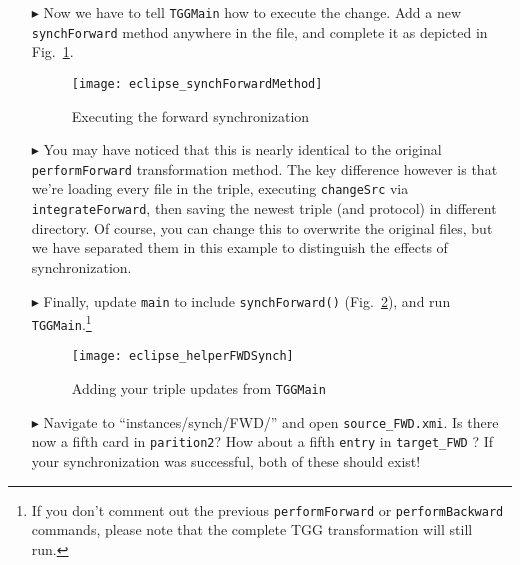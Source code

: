 \begin{itemize}
\item[$\blacktriangleright$] Now we have to tell \texttt{TGGMain} how to execute the change. Add a new \texttt{synchForward} method anywhere in the file, and
complete it as depicted in Fig.~\ref{eclipse:SynchForwardMethod}.

\vspace{0.5cm}

\begin{figure}[htbp]
\begin{center}
  \texttt{[image: eclipse\_synchForwardMethod]}
  \caption{Executing the forward synchronization}
  \label{eclipse:SynchForwardMethod}
\end{center}
\end{figure}

\newpage

\item[$\blacktriangleright$] You may have noticed that this is nearly identical to the original \texttt{performForward} transformation method. The key
difference however is that we're loading every file in the triple, executing \texttt{changeSrc} via \texttt{integrateForward}, then saving the newest triple
(and protocol) in different directory. Of course, you can change this to overwrite the original files, but we have separated them in this example to
distinguish the effects of synchronization.

\item[$\blacktriangleright$] Finally, update \texttt{main} to include \texttt{synchForward()} (Fig.~\ref{eclipse:helperFWD}), and run
\texttt{TGGMain}.\footnote{If you don't comment out the previous \texttt{performForward} or \texttt{performBackward} commands, please note that the complete
TGG transformation will still run.}

\begin{figure}[htbp]
\begin{center}
  \texttt{[image: eclipse\_helperFWDSynch]}
  \caption{Adding your triple updates from \texttt{TGGMain}}
  \label{eclipse:helperFWD}
\end{center}
\end{figure}

\vspace{-0.5cm}

\item[$\blacktriangleright$] Navigate to ``instances/synch/FWD/'' and open \texttt{source\_FWD.xmi}. Is there now a fifth card in \texttt{parition2}? How about
a fifth \texttt{entry} in \texttt{target\_FWD} ? If your synchronization was successful, both of these should exist!


\end{itemize}
